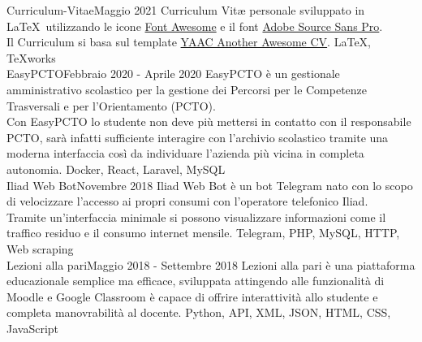%
%
%

\begin{projects}
	\project
	{Curriculum-Vitae}{Maggio 2021}
	{}
		{Curriculum Vitæ personale sviluppato in \LaTeX\ utilizzando le icone \href{https://fontawesome.com}{Font Awesome} e il font \href{https://fonts.google.com/specimen/Source+Sans+Pro}{Adobe Source Sans Pro}.\\Il Curriculum si basa sul template \href{https://github.com/darwiin/yaac-another-awesome-cv}{YAAC Another Awesome CV}.}
	{\LaTeX, TeXworks}\\

	\project
	{EasyPCTO}{Febbraio 2020 - Aprile 2020}
	{}
	{EasyPCTO è un gestionale amministrativo scolastico per la gestione dei Percorsi per le Competenze Trasversali e per l'Orientamento (PCTO).\\Con EasyPCTO lo studente non deve più mettersi in contatto con il responsabile PCTO, sarà infatti sufficiente interagire con l'archivio scolastico tramite una moderna interfaccia così da individuare l'azienda più vicina in completa autonomia.}
	{Docker, React, Laravel, MySQL}\\

	\project
	{Iliad Web Bot}{Novembre 2018}
	{}
	{Iliad Web Bot è un bot Telegram nato con lo scopo di velocizzare l'accesso ai propri consumi con l'operatore telefonico Iliad.\\Tramite un'interfaccia minimale si possono visualizzare informazioni come il traffico residuo e il consumo internet mensile.}
	{Telegram, PHP, MySQL, HTTP, Web scraping}\\

	\project
	{Lezioni alla pari}{Maggio 2018 - Settembre 2018}
	{}
	{Lezioni alla pari è una piattaforma educazionale semplice ma efficace, sviluppata attingendo alle funzionalità di Moodle e Google Classroom è capace di offrire interattività allo studente e completa manovrabilità al docente.}
	{Python, API, XML, JSON, HTML, CSS, JavaScript}

\end{projects}